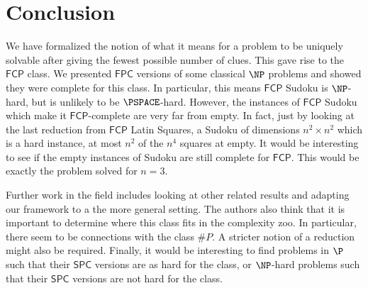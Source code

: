 \documentclass[runningheads,a4paper]{llncs}
\begin{document}
\section{Conclusion}
\label{sec:conclusion}

We have formalized the notion of what it means for a problem to be uniquely solvable after giving the fewest possible number of clues. This gave rise to the $\mathsf{FCP}$ class. We presented $\mathsf{FPC}$ versions of some classical $\NP$ problems and showed they were complete for this class. In particular, this means $\mathsf{FCP}$ Sudoku is $\NP$-hard, but is unlikely to be $\PSPACE$-hard. However, the instances of $\mathsf{FCP}$ Sudoku which make it $\mathsf{FCP}$-complete are very far from empty. In fact, just by looking at the last reduction from $\mathsf{FCP}$ Latin Squares, a Sudoku of dimensions $n^2 \times n^2$ which is a hard instance, at most $n^2$ of the $n^4$ squares at empty. It would be interesting to see if the empty instances of Sudoku are still complete for $\mathsf{FCP}$. This would be exactly the problem \cite{mcguire2012there} solved for $n = 3$. 

Further work in the field includes looking at other related results and adapting our framework to a the more general setting. The authors also think that it is important to determine where this class fits in the complexity zoo. In particular, there seem to be connections with the class $\#P$. A stricter notion of a reduction might also be required. Finally, it would be interesting to find problems in $\P$ such that their $\mathsf{SPC}$ versions are as hard for the class, or $\NP$-hard problems such that their $\mathsf{SPC}$ versions are not hard for the class. 



\end{document}
